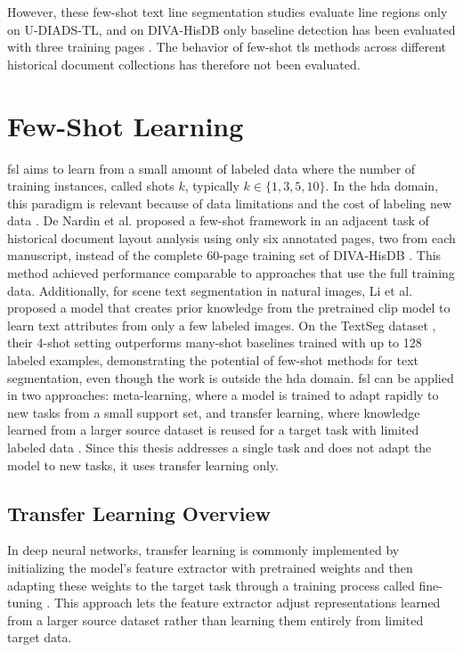 However, these few-shot text line segmentation studies evaluate line regions only on U-DIADS-TL, and on DIVA-HisDB only baseline detection has been evaluated with three training pages \cite{sterzinger2025fewshot}. The behavior of few-shot \gls{tls} methods across different historical document collections has therefore not been evaluated.

\section{Few-Shot Learning}
\label{sec:fsl}

\Gls{fsl} aims to learn from a small amount of labeled data \cite{fsl} where the number of training instances, called shots \(k\), typically \(k \in \{1,3,5,10\}\). In the \gls{hda} domain, this paradigm is relevant because of data limitations and the cost of labeling new data \cite{sterzinger2025fewshot, Zottin_2025_FEST}. De Nardin et al. \cite{De_Nardin_2023} proposed a few-shot framework in an adjacent task of historical document layout analysis using only six annotated pages, two from each manuscript, instead of the complete 60-page training set of DIVA-HisDB \cite{diva_hisdb}. This method achieved performance comparable to approaches that use the full training data. Additionally, for scene text segmentation in natural images, Li et al. \cite{li2025tsalfewshottextsegmentation} proposed a model that creates prior knowledge from the pretrained \gls{clip} model \cite{DBLP:journals/corr/abs-2103-00020} to learn text attributes from only a few labeled images. On the TextSeg dataset \cite{xu2020rethinkingtextsegmentationnovel}, their 4-shot setting outperforms many-shot baselines trained with up to 128 labeled examples, demonstrating the potential of few-shot methods for text segmentation, even though the work is outside the \gls{hda} domain. \Gls{fsl} can be applied in two approaches: meta-learning, where a model is trained to adapt rapidly to new tasks from a small support set, and transfer learning, where knowledge learned from a larger source dataset is reused for a target task with limited labeled data \cite{fsl}. Since this thesis addresses a single task and does not adapt the model to new tasks, it uses transfer learning only.

\subsection{Transfer Learning Overview}

In deep neural networks, transfer learning is commonly implemented by initializing the model's feature extractor with pretrained weights and then adapting these weights to the target task through a training process called fine-tuning \cite{plested2026transfer}. This approach lets the feature extractor adjust representations learned from a larger source dataset rather than learning them entirely from limited target data.


